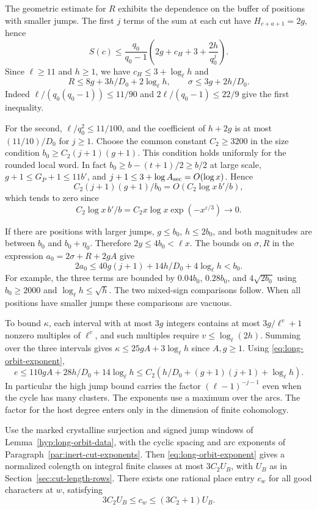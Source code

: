 The geometric estimate for \(R\) exhibits the dependence on the
buffer of positions with smaller jumps. The first \(j\) terms of the sum at each cut have
\(H_{c+a+1}=2g\), hence
\[
 S(c)\le \frac{q_0}{q_0-1}
          \left(2g+c_H+3+\frac{2h}{q_0^j}\right).
\]
Since \(\ell\ge11\) and \(h\ge1\), we have
\(c_H\le3+\log_\ell h\) and
\[
  R\le8g+3h/D_0+2\log_\ell h,
  \qquad \sigma\le3g+2h/D_0.
\]
Indeed \(\ell/(q_0(q_0-1))\le11/90\) and
\(2\ell/(q_0-1)\le22/9\) give the first inequality.

For the second, \(\ell/q_0^2\le11/100\), and the coefficient
of \(h+2g\) is at most \((11/10)/D_0\) for \(j\ge1\).
Choose the common constant \(C_2\ge3200\) in the size condition
\(b_0\ge C_2(j+1)(g+1)\). This condition holds uniformly for
the rounded local word. In fact \(b_0\ge b-(t+1)/2\ge b/2\)
at large scale, \(g+1\le G_P+1\le11b'\), and
\(j+1\le3+\log A_{\rm sec}=O(\log x)\). Hence
\[
 C_2(j+1)(g+1)/b_0=O(C_2\log x\, b'/b),
\]
which tends
to zero since
\[
 C_2\log x\,b'/b=C_2x\log x\exp(-x^{\varepsilon/3})\longrightarrow0.
\]

If there are positions with larger jumps,
\(g\le b_0\), \(h\le2b_0\), and both magnitudes are between
\(b_0\) and \(b_0+\eta_0\). Therefore \(2y\le4b_0<\ell x\).
The bounds on \(\sigma,R\) in the expression \(a_0=2\sigma+R+2gA\) give
\[
 2a_0\le40g(j+1)+14h/D_0+4\log_\ell h<b_0.
\]
For example, the three terms are bounded by \(0.04b_0\),
\(0.28b_0\), and \(4\sqrt{2b_0}\) using \(b_0\ge2000\) and
\(\log_\ell h\le\sqrt h\). The two mixed-sign comparisons follow.
When all positions have smaller jumps these comparisons are vacuous.

To bound \(\kappa\), each interval with at most \(3g\) integers
contains at most \(3g/\ell^v+1\) nonzero multiples of \(\ell^v\),
and such multiples require \(v\le\log_\ell(2h)\). Summing over
the three intervals gives
\(\kappa\le25gA+3\log_\ell h\) since \(A,g\ge1\).
Using \eqref{eq:long-orbit-exponent},
\[
 e\le110gA+28h/D_0+14\log_\ell h
   \le C_2\left(h/D_0+(g+1)(j+1)+\log_\ell h\right).
\]
In particular the high jump bound carries the factor
\((\ell-1)^{-j-1}\) even when the cycle has many clusters. The
exponents use a maximum over the arcs. The factor for the host
degree enters only in the dimension of finite cohomology.



\begin{proposition}\label{prop:inert-long-colength}
Use the marked crystalline surjection and signed jump windows
of Lemma~\ref{hyp:long-orbit-data}, with the cyclic spacing
and arc exponents of Paragraph~\ref{par:inert-cut-exponents}.
Then \eqref{eq:long-orbit-exponent} gives a normalized colength on
integral finite classes at most \(3C_2U_B\), with \(U_B\) as in
Section~\ref{sec:cut-length-rows}.
There exists one rational place entry \(c_w\) for all good characters at \(w\), satisfying
\[
 3C_2U_B\le c_w\le(3C_2+1)U_B.
\]
\end{proposition}

